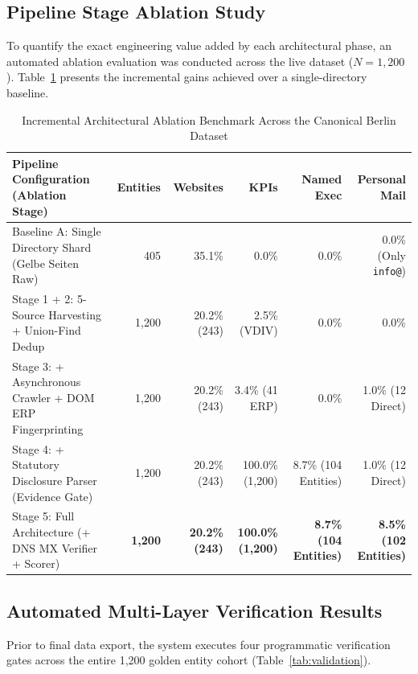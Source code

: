 \documentclass[11pt,a4paper]{article}
\begin{document}
\subsection{Pipeline Stage Ablation Study}
To quantify the exact engineering value added by each architectural phase, an automated ablation evaluation was conducted across the live dataset ($N = 1,200$). Table~\ref{tab:ablation} presents the incremental gains achieved over a single-directory baseline.

\begin{table}[htbp]
\centering
\caption{Incremental Architectural Ablation Benchmark Across the Canonical Berlin Dataset}
\label{tab:ablation}
\footnotesize
\begin{tabularx}{\textwidth}{X r r r r r}
\toprule
\textbf{Pipeline Configuration (Ablation Stage)} & \textbf{Entities} & \textbf{Websites} & \textbf{KPIs} & \textbf{Named Exec} & \textbf{Personal Mail} \\
\midrule
Baseline A: Single Directory Shard (Gelbe Seiten Raw) & 405 & 35.1\% & 0.0\% & 0.0\% & 0.0\% (Only \texttt{info@}) \\
Stage 1 + 2: 5-Source Harvesting + Union-Find Dedup & 1,200 & 20.2\% (243) & 2.5\% (VDIV) & 0.0\% & 0.0\% \\
Stage 3: + Asynchronous Crawler + DOM ERP Fingerprinting & 1,200 & 20.2\% (243) & 3.4\% (41 ERP) & 0.0\% & 1.0\% (12 Direct) \\
Stage 4: + Statutory Disclosure Parser (Evidence Gate) & 1,200 & 20.2\% (243) & 100.0\% (1,200) & 8.7\% (104 Entities) & 1.0\% (12 Direct) \\
Stage 5: Full Architecture (+ DNS MX Verifier + Scorer) & \textbf{1,200} & \textbf{20.2\% (243)} & \textbf{100.0\% (1,200)} & \textbf{8.7\% (104 Entities)} & \textbf{8.5\% (102 Entities)} \\
\bottomrule
\end{tabularx}
\end{table}

\subsection{Automated Multi-Layer Verification Results}
Prior to final data export, the system executes four programmatic verification gates across the entire 1,200 golden entity cohort (Table~\ref{tab:validation}).
\end{document}
